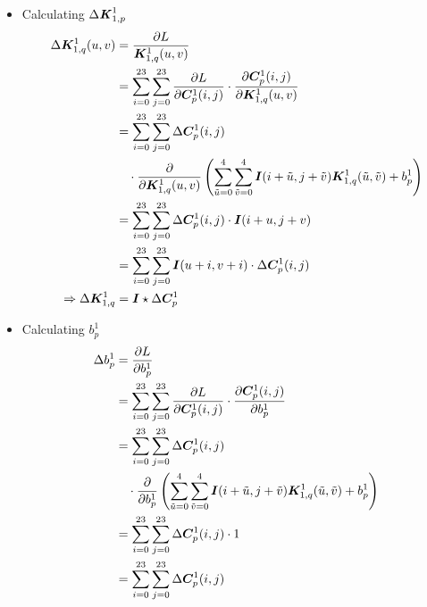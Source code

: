 \documentclass[12pt]{article}
\begin{document}
\begin{itemize}
\item Calculating $\Delta \textbf{\textit{K}}_{1, p}^1$
\begin{align*}
    \Delta \bm{K}_{1, q}^1(u, v)
    &= \frac{\partial L}{\bm{K}_{1, q}^1(u, v)}\\
    &= \sum_{i=0}^{23}\sum_{j=0}^{23}\frac{\partial L}{\partial\bm{C}_{p}^1(i, j)}
    \cdot
    \frac{\partial\bm{C}_{p}^1(i, j)}{\partial\bm{K}_{1, q}^1(u, v)}\\
    &= \sum_{i=0}^{23}\sum_{j=0}^{23}\Delta \bm{C}_{p}^1(i, j)\\
    &\quad\cdot
    \frac{\partial}{\partial\bm{K}_{1, q}^1(u, v)}
    \left(\sum_{\Tilde{u} = 0}^4\sum_{\Tilde{v} = 0}^4\bm{I}(i + \Tilde{u}, j + \Tilde{v})\bm{K}^1_{1, q}(\Tilde{u}, \Tilde{v}) + b^1_p\right)\\
    &= \sum_{i=0}^{23}\sum_{j=0}^{23}\Delta \bm{C}_{p}^1(i, j) \cdot \bm{I}(i + u, j + v)\\
    &= \sum_{i=0}^{23}\sum_{j=0}^{23} \bm{I}(u + i, v + i) \cdot \Delta\bm{C}_{p}^1(i, j) \\
    \Rightarrow
    \Delta \bm{K}_{1, q}^1 &= \bm{I} \star \Delta\bm{C}_{p}^1
\end{align*}

\item Calculating $b^1_p$
\begin{align*}
    \Delta b^1_p
    &= \frac{\partial L}{\partial b^1_p}\\
    &= \sum_{i=0}^{23}\sum_{j=0}^{23}\frac{\partial L}{\partial\bm{C}_{p}^1(i, j)}
    \cdot
    \frac{\partial\bm{C}_{p}^1(i, j)}{\partial b^1_p}\\
    &= \sum_{i=0}^{23}\sum_{j=0}^{23}\Delta \bm{C}_{p}^1(i, j)\\
    &\quad\cdot
    \frac{\partial}{\partial b^1_p}
    \left(\sum_{\Tilde{u} = 0}^4\sum_{\Tilde{v} = 0}^4\bm{I}(i + \Tilde{u}, j + \Tilde{v})\bm{K}^1_{1, q}(\Tilde{u}, \Tilde{v}) + b^1_p\right)\\
    &= \sum_{i=0}^{23}\sum_{j=0}^{23}\Delta \bm{C}_{p}^1(i, j) \cdot 1\\
    &= \sum_{i=0}^{23}\sum_{j=0}^{23}\Delta \bm{C}_{p}^1(i, j)
\end{align*}

\end{itemize}
\end{document}
